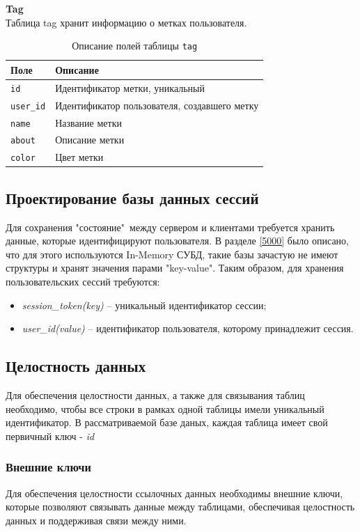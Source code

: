 \noindent\textbf{Tag}\\
Таблица tag хранит информацию о метках пользователя.
\begin{table}[!ht]
	\caption{Описание полей таблицы \texttt{tag}}
	\label{tbl:tag}
	\begin{center}
		\begin{tabular}{|p{}|p{}|}
			\hline
			\textbf{Поле} & \textbf{Описание} \\\hline
			\texttt{id} & Идентификатор метки, уникальный \\\hline
			\texttt{user\_id} & Идентификатор пользователя, создавшего метку \\\hline
			\texttt{name} & Название метки\\\hline
			\texttt{about} & Описание метки\\\hline
			\texttt{color} & Цвет метки \\\hline
		\end{tabular}
	\end{center}
\end{table}

\subsection{Проектирование базы данных сессий}
Для сохранения "состояние"\ между сервером и клиентами требуется хранить данные, которые идентифицируют пользователя. В разделе \ref{5000} было описано, что для этого используются In-Memory СУБД, такие базы зачастую не имеют структуры и хранят значения парами "key-value".  Таким образом, для хранения пользовательских сессий требуются:

\begin{itemize}[leftmargin=1.6\parindent]
	\item \textit{session\_token(key)} -- уникальный идентификатор сессии;
	\item \textit{user\_id(value)} -- идентификатор пользователя, которому принадлежит сессия.
\end{itemize}

\subsection{Целостность данных}
Для обеспечения целостности данных, а также для связывания таблиц необходимо, чтобы все строки  в рамках одной таблицы имели уникальный идентификатор. В рассматриваемой базе даных, каждая таблица имеет свой первичный ключ - \textit{id}
\subsubsection*{Внешние ключи}
Для обеспечения целостности ссылочных данных необходимы внешние ключи, которые позволяют связывать данные между таблицами, обеспечивая целостность данных и поддерживая связи между ними.

